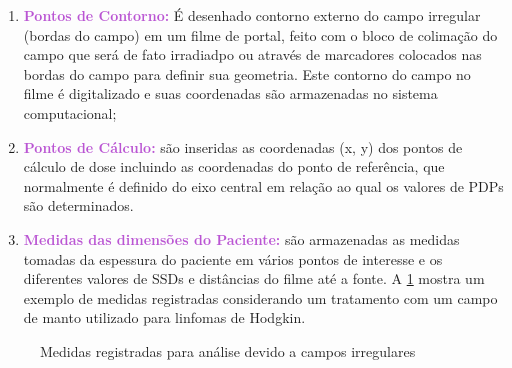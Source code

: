 \documentclass[11pt,a4paper]{article}
\newcounter{exemplo}
\begin{document}
        \begin{enumerate}[label=\textcolor{CarnationPink}{\roman*.}]
            \item \textcolor{MediumOrchid}{\textbf{Pontos de Contorno:}} É desenhado contorno externo do campo irregular (bordas do campo) em um filme de portal, feito com o bloco de colimação do campo que será de fato irradiadpo ou através de marcadores colocados nas bordas do campo para definir sua geometria. Este contorno do campo no filme é digitalizado e suas coordenadas são armazenadas no sistema computacional;
            \item \textcolor{MediumOrchid}{\textbf{Pontos de Cálculo:}} são inseridas as coordenadas (x, y) dos pontos de cálculo de dose incluindo as coordenadas do ponto de referência, que normalmente é definido do eixo central em relação ao qual os valores de PDPs são determinados.
            \item \textcolor{MediumOrchid}{\textbf{Medidas das dimensões do Paciente:}} são armazenadas as medidas tomadas da espessura do paciente em vários pontos de interesse e os diferentes  valores de SSDs e distâncias do filme até a fonte. A \ref{fig:distanciasCamposIrregulares} mostra um exemplo de medidas registradas considerando um tratamento com um campo de manto utilizado para linfomas de Hodgkin.            
        \end{enumerate}
            
                \begin{figure}[h]
                    \centering
                    \caption{Medidas registradas para análise devido a campos irregulares}
                    \label{fig:distanciasCamposIrregulares}
                \end{figure}
\end{document}

